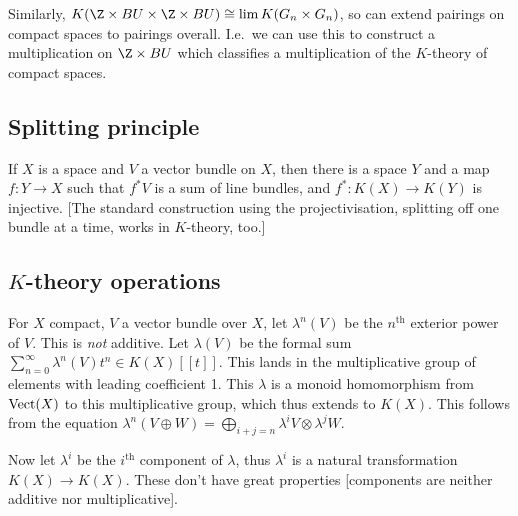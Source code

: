 \documentclass[11pt]{article}
\begin{document}
\begin{MarkusKtheory}
Similarly, $K(\Z\times BU\times\Z\times BU)\cong\lim K(G_n\times G_n)$, so can extend pairings on compact spaces to pairings overall. I.e.\ we can use this to construct a multiplication on $\Z\times BU$ which classifies a multiplication of the $K$-theory of compact spaces.
\subsection*{Splitting principle}
If $X$ is a space and $V$ a vector bundle on $X$, then there is a space $Y$ and a map $f:Y\to X$ such that $f^*V$ is a sum of line bundles, and $f^*:K(X)\to K(Y)$ is injective.
[The standard construction using the projectivisation, splitting off one bundle at a time, works in $K$-theory, too.]
\subsection*{$K$-theory operations}
For $X$ compact, $V$ a vector bundle over $X$, let $\lambda^n(V)$ be the $n^\text{th}$ exterior power of $V$. This is \emph{not} additive. Let $\lambda(V)$ be the formal sum $\sum_{n=0}^\infty \lambda^n(V) t^n\in K(X)[[t]]$. This lands in the multiplicative group of elements with leading coefficient 1. This $\lambda$ is a monoid homomorphism from $\operatorname{Vect}(X)$ to this multiplicative group, which thus extends to $K(X)$. This follows from the equation $\lambda^n(V\oplus W)=\bigoplus_{i+j=n} \lambda^i V\otimes\lambda^jW$.

Now let $\lambda^i$ be the $i^\text{th}$ component of $\lambda$, thus $\lambda^i$ is a natural transformation $K(X)\to K(X)$. These don't have great properties [components are neither additive nor multiplicative].

\end{MarkusKtheory}
\end{document}
